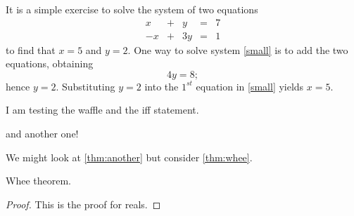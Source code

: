 \documentclass{ximera}
\begin{document}





It is a simple exercise to solve the system of two equations
\begin{equation} \label{small}
\begin{array}{rcrcr}
 x & + & y & = & 7 \\
-x & + & 3y & = & 1
\end{array}
\end{equation}
to find that $x=5$ and $y=2$.  One way to solve
system \eqref{small} is to add the two equations, obtaining
\[
4y=8;
\]
hence $y=2$.  Substituting $y=2$ into the $1^{st}$ equation in
\ref{small} yields $x=5$.


I am testing the waffle and the iff statement.



and another one!



We might look at \ref{thm:another} but consider \ref{thm:whee}.

\begin{theorem}
  \label{thm:whee}  Whee theorem.
\end{theorem}
\begin{proof}
This is the proof for reals.
\end{proof}
\end{document}
